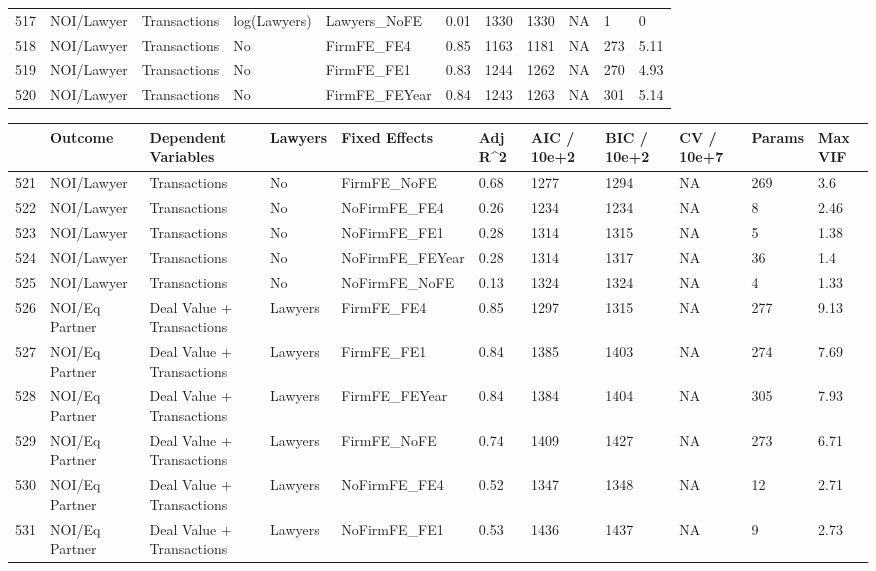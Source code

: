 \documentclass{article}
\begin{document}
\begin{table}[H]
\begin{tabular}{rllllllllll}
  517 & NOI/Lawyer & Transactions & log(Lawyers) & Lawyers\_NoFE & 0.01 & 1330 & 1330 & NA & 1 & 0 \\
  518 & NOI/Lawyer & Transactions & No & FirmFE\_FE4 & 0.85 & 1163 & 1181 & NA & 273 & 5.11 \\
  519 & NOI/Lawyer & Transactions & No & FirmFE\_FE1 & 0.83 & 1244 & 1262 & NA & 270 & 4.93 \\
  520 & NOI/Lawyer & Transactions & No & FirmFE\_FEYear & 0.84 & 1243 & 1263 & NA & 301 & 5.14 \\
   \hline
\end{tabular}
\end{table}
\begin{table}[H]
\centering
\begin{tabular}{rllllllllll}
  \hline
 & Outcome & Dependent Variables & Lawyers & Fixed Effects & Adj R^2 & AIC / 10e+2 & BIC / 10e+2 & CV / 10e+7 & Params & Max VIF \\
  \hline
521 & NOI/Lawyer & Transactions & No & FirmFE\_NoFE & 0.68 & 1277 & 1294 & NA & 269 & 3.6 \\
  522 & NOI/Lawyer & Transactions & No & NoFirmFE\_FE4 & 0.26 & 1234 & 1234 & NA & 8 & 2.46 \\
  523 & NOI/Lawyer & Transactions & No & NoFirmFE\_FE1 & 0.28 & 1314 & 1315 & NA & 5 & 1.38 \\
  524 & NOI/Lawyer & Transactions & No & NoFirmFE\_FEYear & 0.28 & 1314 & 1317 & NA & 36 & 1.4 \\
  525 & NOI/Lawyer & Transactions & No & NoFirmFE\_NoFE & 0.13 & 1324 & 1324 & NA & 4 & 1.33 \\
  526 & NOI/Eq Partner & Deal Value + Transactions & Lawyers & FirmFE\_FE4 & 0.85 & 1297 & 1315 & NA & 277 & 9.13 \\
  527 & NOI/Eq Partner & Deal Value + Transactions & Lawyers & FirmFE\_FE1 & 0.84 & 1385 & 1403 & NA & 274 & 7.69 \\
  528 & NOI/Eq Partner & Deal Value + Transactions & Lawyers & FirmFE\_FEYear & 0.84 & 1384 & 1404 & NA & 305 & 7.93 \\
  529 & NOI/Eq Partner & Deal Value + Transactions & Lawyers & FirmFE\_NoFE & 0.74 & 1409 & 1427 & NA & 273 & 6.71 \\
  530 & NOI/Eq Partner & Deal Value + Transactions & Lawyers & NoFirmFE\_FE4 & 0.52 & 1347 & 1348 & NA & 12 & 2.71 \\
  531 & NOI/Eq Partner & Deal Value + Transactions & Lawyers & NoFirmFE\_FE1 & 0.53 & 1436 & 1437 & NA & 9 & 2.73 \\

\end{tabular}
\end{table}
\end{document}
